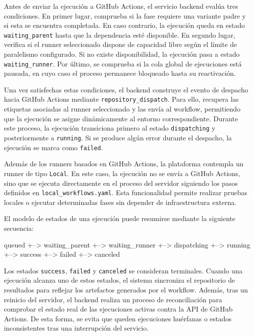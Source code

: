 Antes de enviar la ejecución a GitHub Actions, el servicio backend evalúa tres condiciones. En primer lugar, comprueba si la fase requiere una variante padre y si esta se encuentra completada. En caso contrario, la ejecución queda en estado \texttt{waiting\_parent} hasta que la dependencia esté disponible. En segundo lugar, verifica si el runner seleccionado dispone de capacidad libre según el límite de paralelismo configurado. Si no existe disponibilidad, la ejecución pasa a estado \texttt{waiting\_runner}. Por último, se comprueba si la cola global de ejecuciones está pausada, en cuyo caso el proceso permanece bloqueado hasta su reactivación.

Una vez satisfechas estas condiciones, el backend construye el evento de despacho hacia GitHub Actions mediante \texttt{repository\_dispatch}. Para ello, recupera las etiquetas asociadas al runner seleccionado y las envía al workflow, permitiendo que la ejecución se asigne dinámicamente al entorno correspondiente. Durante este proceso, la ejecución transiciona primero al estado \texttt{dispatching} y posteriormente a \texttt{running}. Si se produce algún error durante el despacho, la ejecución se marca como \texttt{failed}.

Además de los runners basados en GitHub Actions, la plataforma contempla un runner de tipo \texttt{Local}. En este caso, la ejecución no se envía a GitHub Actions, sino que se ejecuta directamente en el proceso del servidor siguiendo los pasos definidos en \texttt{local\_workflows.yaml}. Esta funcionalidad permite realizar pruebas locales o ejecutar determinadas fases sin depender de infraestructura externa.

El modelo de estados de una ejecución puede resumirse mediante la siguiente secuencia:

\begin{blockPseudocodigo}
queued
  +--> waiting_parent
        +--> waiting_runner
              +--> dispatching
                    +--> running
                          +--> success
                          +--> failed
                          +--> canceled
\end{blockPseudocodigo}

Los estados \texttt{success}, \texttt{failed} y \texttt{canceled} se consideran terminales. Cuando una ejecución alcanza uno de estos estados, el sistema sincroniza el repositorio de resultados para reflejar los artefactos generados por el workflow. Además, tras un reinicio del servidor, el backend realiza un proceso de reconciliación para comprobar el estado real de las ejecuciones activas contra la API de GitHub Actions. De esta forma, se evita que queden ejecuciones huérfanas o estados inconsistentes tras una interrupción del servicio.

